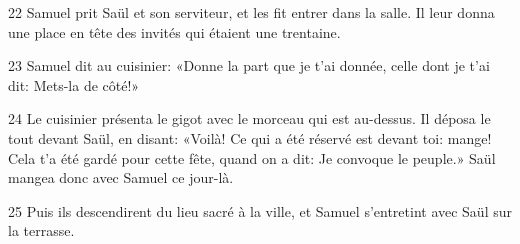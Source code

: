 
22 Samuel prit Saül et son serviteur, et les fit entrer dans la salle. Il leur donna une place en tête des invités qui étaient une trentaine.

23 Samuel dit au cuisinier: «Donne la part que je t’ai donnée, celle dont je t’ai dit: Mets-la de côté!»

24 Le cuisinier présenta le gigot avec le morceau qui est au-dessus. Il déposa le tout devant Saül, en disant: «Voilà! Ce qui a été réservé est devant toi: mange! Cela t’a été gardé pour cette fête, quand on a dit: Je convoque le peuple.» Saül mangea donc avec Samuel ce jour-là.

25 Puis ils descendirent du lieu sacré à la ville, et Samuel s’entretint avec Saül sur la terrasse.
